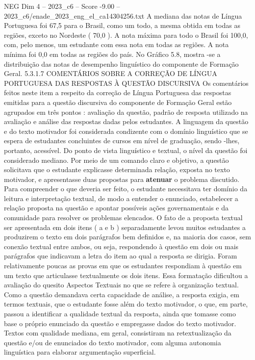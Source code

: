 \begin{textsample}{NEG Dim 4 – 2023\_c6 – Score -9.00 – 2023\_c6/enade\_2023\_eng\_el\_ca14304256.txt}
A mediana das notas de Língua Portuguesa foi 67,5 para o Brasil, como um todo, a mesma obtida em todas as regiões, exceto no Nordeste ( 70,0 ).
A nota máxima para todo o Brasil foi 100,0, com, pelo menos, um estudante com essa nota em todas as regiões.
A nota mínima foi 0,0 em todas as regiões do país.
No Gráfico 5.8, mostra -se a distribuição das notas de desempenho linguístico do componente de Formação Geral. 5.3.1.7 COMENTÁRIOS SOBRE A CORREÇÃO DE LÍNGUA PORTUGUESA DAS RESPOSTAS À QUESTÃO DISCURSIVA Os comentários feitos neste item a respeito da correção de Língua Portuguesa das respostas emitidas para a questão discursiva do componente de Formação Geral estão agrupados em três pontos : avaliação da questão, padrão de resposta utilizado na avaliação e análise das respostas dadas pelos estudantes.
A linguagem da questão e do texto motivador foi considerada condizente com o domínio linguístico que se espera de estudantes concluintes de cursos em nível de graduação, sendo -lhes, portanto, acessível.
Do ponto de vista linguístico e textual, o nível da questão foi considerado mediano.
Por meio de um comando claro e objetivo, a questão solicitava que o estudante explicasse determinada relação, exposta no texto motivador, e apresentasse duas propostas para \textbf{atenuar} o problema discutido.
Para compreender o que deveria ser feito, o estudante necessitava ter domínio da leitura e interpretação textual, de modo a entender o enunciado, estabelecer a relação proposta na questão e apontar possíveis ações governamentais e da comunidade para resolver os problemas elencados.
O fato de a proposta textual ser apresentada em dois itens ( a e b ) separadamente levou muitos estudantes a produzirem o texto em dois parágrafos bem definidos e, na maioria dos casos, sem conexão textual entre ambos, ou seja, respondendo à questão em dois ou mais parágrafos que indicavam a letra do item ao qual a resposta se dirigia.
Foram relativamente poucas as provas em que os estudantes respondiam à questão em um texto que articulasse textualmente os dois itens.
Essa formatação dificultou a avaliação do quesito Aspectos Textuais no que se refere à organização textual.
Como a questão demandava certa capacidade de análise, a resposta exigia, em termos textuais, que o estudante fosse além do texto motivador, o que, em parte, passou a identificar a qualidade textual da resposta, ainda que tomasse como base o próprio enunciado da questão e empregasse dados do texto motivador.
Textos com qualidade mediana, em geral, consistiram na retextualização da questão e/ou de enunciados do texto motivador, com alguma autonomia linguística para elaborar argumentação superficial.

\end{textsample}
